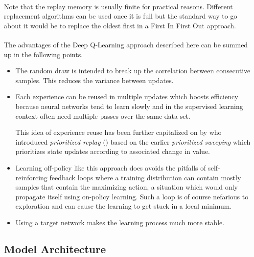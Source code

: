 \paragraph{}
Note that the replay memory is usually finite for practical reasons.
Different replacement algorithms can be used once it is full
but the standard way to go about it
would be to replace the oldest first
in a First In First Out approach.

\paragraph{}
The advantages of the Deep Q-Learning approach described here
can be summed up in the following points.

\begin{itemize}
  \item The random draw is intended to break up the correlation
    between consecutive samples.
    This reduces the variance between updates.
  \item Each experience can be reused
    in multiple updates which boosts efficiency
    because neural networks tend to learn slowly
    and in the supervised learning context often need multiple passes
    over the same data-set.

    This idea of experience reuse has been further capitalized on by
    \citeauthor{Schaul2016} who introduced
    \textit{prioritized replay} (\citeyear{Schaul2016})
    based on the earlier \textit{prioritized sweeping} \parencite{Moore1993}
    which prioritizes state updates according to associated change in value.
  \item Learning off-policy like this approach does
    avoids the pitfalls of self-reinforcing feedback loops
    where a training distribution can contain mostly samples
    that contain the maximizing action,
    a situation which would only propagate itself using on-policy learning.
    Such a loop is of course nefarious to exploration
    and can cause the learning to get stuck in a local minimum.
  \item Using a target network makes the learning process much more stable.
\end{itemize}


\subsection{Model Architecture}
\label{sub:model_architecture}

